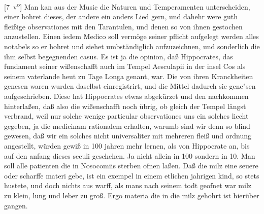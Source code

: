 [7~v\textsuperscript{o}]
\pend%
\count{}
\count{}
\count{}
\pstart%
Man kan aus der Music die Naturen und Temperamenten\protect{} unterscheiden, einer hohret dieses, der andere ein anders Lied gern, und dahehr were guth flei{\ss}ige observationes mit den Tarantulen\protect{}, und denen so von ihnen gestochen anzustellen.
\pend%
\pstart%
Einen iedem Medico\protect{} soll verm\"{o}ge seiner pflicht aufgelegt werden alles notabels so er hohret und siehet umbst\"{a}ndiglich aufzuzeichnen, und sonderlich die ihm selbst begegnenden casus.
Es ist ja die opinion, da{\ss} Hippocrates,\protect{} das fundament seiner wi{\ss}enschafft auch im Tempel Aesculapii\protect{}
in der insel Cos\protect{} als seinem vaterlande heut zu Tage Longa\protect{} genant, war. Die von ihren Kranckheiten\protect{} genesen waren wurden daselbst einregistrirt, und die Mittel dadurch sie gene"sen aufgeschrieben. Diese hat Hippocrates\protect{} etwas abgek\"{u}rzet und den nachkommen hinterla{\ss}en, da{\ss} also die wi{\ss}enschafft noch \"{u}brig, ob gleich der Tempel l\"{a}ngst verbrand, weil nur solche wenige particular observationes uns ein solches liecht gegeben, ja die medicinam\protect{} rationalem erhalten, warumb sind wir denn so blind gewesen, da{\ss} wir ein solches nicht universaliter mit mehreren flei{\ss} und ordnung angestellt, w\"{u}rden gewi{\ss} in 100 jahren mehr lernen, als von Hippocrate\protect{} an, bis auf den anfang dieses seculi geschehen. Ja nicht allein in 100 sondern in 10.
\pend%
\pstart%
Man soll alle patienten die in Nosocomiis\protect{} sterben ofnen la{\ss}en.
\pend%
\pstart%
Da{\ss} die milz\protect{} eine seuere oder scharffe materi gebe, ist ein exempel in einem etlichen jahrigen kind, so stets hustete, und doch nichts aus warff, als mans nach seinem todt geofnet war milz\protect{} zu klein, lung\protect{} und leber\protect{} zu gro{\ss}. Ergo materia die in die milz\protect{} gehohrt ist hier\"{u}ber gangen.%
